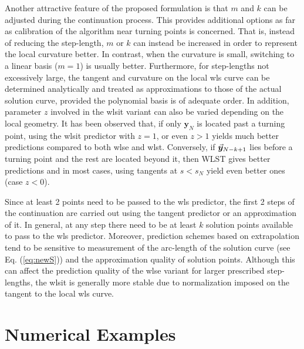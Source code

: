 Another attractive feature of the proposed formulation is that $m$ and $k$ can
be adjusted during the continuation process. This provides additional options 
as far as calibration of the algorithm near turning
points is concerned. That is, instead of reducing the step-length, $m$ or $k$
can instead be increased in order to represent the local curvature better. In
contrast, when the curvature is small, switching to a linear basis ($m=1$) is
usually better.
Furthermore, for step-lengths not excessively large, the tangent and curvature 
on the local \acrshort{wls} curve can be determined analytically and treated as
approximations to those of the actual solution curve, provided the polynomial
basis is of adequate order. In addition, parameter $z$ involved in the 
\acrshort{wlsit}
variant can also be varied depending on the local geometry. It has been
observed that, if only $\bm{y}_N$ is located past a 
turning point,
using the \acrshort{wlsit} predictor with $z=1$, or even $z>1$ yields much 
better 
predictions compared
to both \acrshort{wlse} and \acrshort{wlst}. Conversely, if $\vec{\bm{y}}_{N-k+1}$  
lies before a turning
point and the rest are located beyond it, then WLST gives better predictions and
in most cases, using tangents at $s<s_N$ yield even better ones (case $z<0$). 

Since at least 2 points need to be passed to the \acrshort{wls} predictor, the 
first 2
steps of the continuation are carried out using the tangent predictor or an
approximation of it. In general, at any step there need to be at least $k$
solution points available to pass to the \acrshort{wls} predictor. Moreover, 
prediction
schemes based on extrapolation tend to be sensitive to measurement of the
arc-length of the solution curve (see Eq. (\ref{eq:newS})) and the 
approximation 
quality of solution points\cite{Lundberg91,Mackens89}. Although this can affect 
the prediction quality of the \acrshort{wlse} variant
for larger prescribed step-lengths, the \acrshort{wlsit} is generally more 
stable due to normalization imposed on the tangent to the local \acrshort{wls} 
curve. 


\section{Numerical Examples}\label{CH5-S4}

